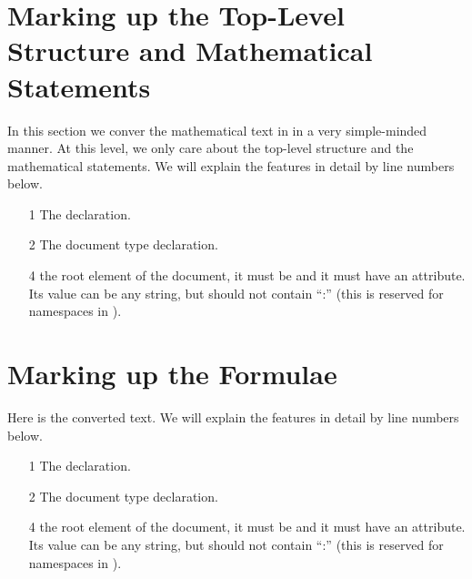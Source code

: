 \section{Marking up the Top-Level Structure and Mathematical Statements}\label{sec:algebra1}

In this section we conver the mathematical text in {} in a very
simple-minded manner. At this level, we only care about the top-level structure
and the mathematical statements. We will explain the features in detail by line
numbers below.  

{\scriptsize{}}
\begin{itemize}
\item[1] The {\xml} declaration. 
\item[2] The document type declaration. 
\item[4] the root element of the document, it must be {} and it must have
  an {} attribute. Its value can be any string, but should not contain
  ``:'' (this is reserved for namespaces in {\xml}).
\end{itemize}

\section{Marking up the Formulae}\label{sec:algebra2}
Here is the converted text. We will explain the features in detail by line numbers  below.
{\scriptsize{}}
\begin{itemize}
\item[1] The {\xml} declaration. 
\item[2] The document type declaration. 
\item[4] the root element of the document, it must be {} and it must have
  an {} attribute. Its value can be any string, but should not contain
  ``:'' (this is reserved for namespaces in {\xml}).
\end{itemize}


